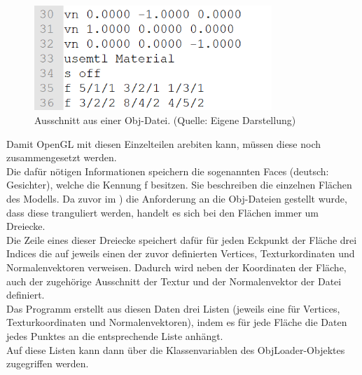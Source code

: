 \begin{figure}
\centering
\includegraphics[width=0.8\textwidth]{Abbildungen/obj-datei.png}
\caption[Obj-Dateiformat]{Ausschnitt aus einer Obj-Datei. (Quelle: Eigene Darstellung)}
\label{fig:obj-datei}
\end{figure}
Damit OpenGL mit diesen Einzelteilen arebiten kann, müssen diese noch zusammengesetzt werden. \\
Die dafür nötigen Informationen speichern die sogenannten Faces (deutsch: \glqq Gesichter\grqq ), welche die Kennung f besitzen. Sie beschreiben die einzelnen Flächen des Modells. Da zuvor im ) die Anforderung an die Obj-Dateien gestellt wurde, dass diese tranguliert werden, handelt es sich bei den Flächen immer um Dreiecke. \\ 
Die Zeile eines dieser Dreiecke speichert dafür für jeden Eckpunkt der Fläche drei Indices die auf jeweils einen der  zuvor definierten Vertices, Texturkordinaten und Normalenvektoren verweisen. Dadurch wird neben der Koordinaten der Fläche, auch der zugehörige Ausschnitt der Textur und der Normalenvektor der Datei definiert. \\
Das Programm erstellt aus diesen Daten drei Listen (jeweils eine für Vertices, Texturkoordinaten und Normalenvektoren), indem es für jede Fläche die Daten jedes Punktes an die entsprechende Liste anhängt.\\
Auf diese Listen kann dann über die Klassenvariablen des ObjLoader-Objektes zugegriffen werden.



